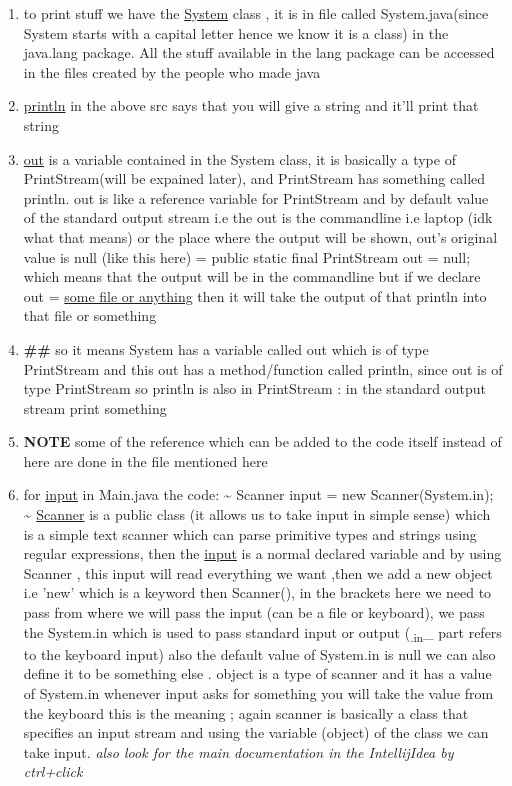 \documentclass[11pt]{article}
\begin{document}
\begin{enumerate}
\item to print stuff we have the \uline{System} class , it is in file called System.java(since System starts with a capital letter hence we know it is a class) in the java.lang package. All the stuff available in the lang package can be accessed in the files created by the people who made java
\item \uline{println} in the above src says that you will give a string and it'll print that string
\item \uline{out} is a variable contained in the System class, it is basically a type of PrintStream(will be expained later), and PrintStream has something called println. out is like a reference variable for PrintStream and by default value of the standard output stream i.e the out is the commandline i.e laptop (idk what that means) or the place where the output will be shown, out's original value is null (like this here) = public static final PrintStream out = null; which means that the output will be in the commandline but if we declare out = \uline{some file or anything} then it will take the output of that println into that file or something
\item \textbf{\#\#} so it means System has a variable called out which is of type PrintStream and this out has a method/function called println, since out is of type PrintStream so println is also in PrintStream : in the standard output stream print something

\item \textbf{NOTE} some of the reference  which can be added to the code itself instead of here are done in the file mentioned here

\item for \uline{input} in Main.java the code: \textasciitilde{} Scanner input = new Scanner(System.in); \textasciitilde{}  \uline{Scanner} is a public class (it allows us to take input in simple sense) which is a simple text scanner which can parse primitive types and strings using regular expressions, then the \uline{input} is a normal declared variable and by using Scanner , this input will read everything we want ,then we add a new object i.e 'new' which is a keyword then Scanner(), in the brackets here we need to pass from where we will pass the input (can be a file or keyboard), we pass the System.in which is used to pass standard input or output (\textsubscript{.in}\_ part refers to the keyboard input) also the default value of System.in is null we can also define it to be something else . object is a type of scanner and it has a value of System.in whenever input asks for something you will take the value from the keyboard this is the meaning ; again scanner is basically a class that specifies an input stream and using the variable (object) of the class we can take input.
\emph{also look for the main documentation in the IntellijIdea by ctrl+click}


\end{enumerate}
\end{document}
